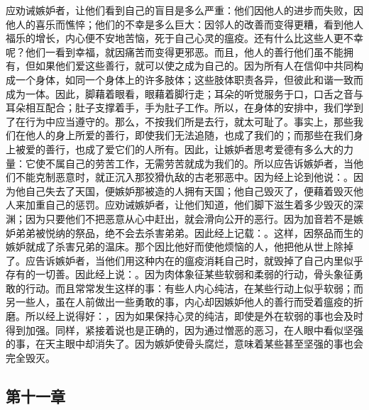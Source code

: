应劝诫嫉妒者，让他们看到自己的盲目是多么严重：他们因他人的进步而失败，因他人的喜乐而憔悴；他们的不幸是多么巨大：因邻人的改善而变得更糟，看到他人福乐的增长，内心便不安地苦恼，死于自己心灵的瘟疫。还有什么比这些人更不幸呢？他们一看到幸福，就因痛苦而变得更邪恶。而且，他人的善行他们虽不能拥有，但如果他们爱这些善行，就可以使之成为自己的。因为所有人在信仰中共同构成一个身体，如同一个身体上的许多肢体；这些肢体职责各异，但彼此和谐一致而成为一体。因此，脚藉着眼看，眼藉着脚行走；耳朵的听觉服务于口，口舌之音与耳朵相互配合；肚子支撑着手，手为肚子工作。所以，在身体的安排中，我们学到了在行为中应当遵守的。那么，不按我们所是去行，就太可耻了。事实上，那些我们在他人的身上所爱的善行，即使我们无法追随，也成了我们的；而那些在我们身上被爱的善行，也成了爱它们的人所有。因此，让嫉妒者思考爱德有多么大的力量：它使不属自己的劳苦工作，无需劳苦就成为我们的。所以应告诉嫉妒者，当他们不能克制恶意时，就正沉入那狡猾仇敌的古老邪恶中。因为经上论到他说：。因为他自己失去了天国，便嫉妒那被造的人拥有天国；他自己毁灭了，便藉着毁灭他人来加重自己的惩罚。应劝诫嫉妒者，让他们知道，他们脚下滋生着多少毁灭的深渊；因为只要他们不把恶意从心中赶出，就会滑向公开的恶行。因为加音若不是嫉妒弟弟被悦纳的祭品，绝不会去杀害弟弟。因此经上记载：。这样，因祭品而生的嫉妒就成了杀害兄弟的温床。那个因比他好而使他烦恼的人，他把他从世上除掉了。应告诉嫉妒者，当他们用这种内在的瘟疫消耗自己时，就毁掉了自己内里似乎存有的一切善。因此经上说：。因为肉体象征某些软弱和柔弱的行动，骨头象征勇敢的行动。而且常常发生这样的事：有些人内心纯洁，在某些行动上似乎软弱；而另一些人，虽在人前做出一些勇敢的事，内心却因嫉妒他人的善行而受着瘟疫的折磨。所以经上说得好：，因为如果保持心灵的纯洁，即使是外在软弱的事也会及时得到加强。同样，紧接着说也是正确的，因为通过憎恶的恶习，在人眼中看似坚强的事，在天主眼中却消失了。因为嫉妒使骨头腐烂，意味着某些甚至坚强的事也会完全毁灭。\par


\subsection{第十一章}

\par

